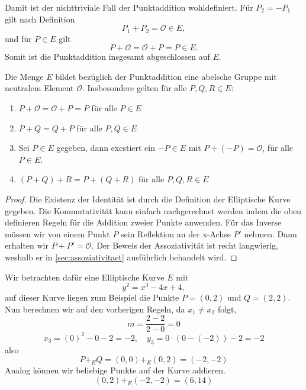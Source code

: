 \begin{bemerkung}
    \label{bem:sum-ist-identitaet}
    Damit ist der nichttriviale Fall der Punktaddition wohldefiniert.
    Für $P_2=-P_1$ gilt nach Definition
    \[
        P_1+P_2=\mathcal{O}\in E,
    \]
    und für $P\in E$ gilt
    \[
        P+\mathcal{O}=\mathcal{O}+P=P\in E.
    \]
    Somit ist die Punktaddition insgesamt abgeschlossen auf $E$.
\end{bemerkung}

\begin{theorem}
    \label{theo:eigenschaften-addition}
    Die Menge $E$ bildet bezüglich der Punktaddition eine abelsche Gruppe
    mit neutralem Element $\mathcal{O}$. Insbesondere gelten für alle
    $P,Q,R\in E$:
    \begin{enumerate}
        \item [Existenz der Identität:] \(P+\mathcal{O}=\mathcal{O}+P=P\) für alle \(P\in E\)
        \item [Kommutativität:] \(P+Q=Q+P\) für alle \(P,Q\in E\)
        \item [Existenz des Inversen:] Sei $P\in E$ gegeben, dann exestiert ein $-P\in E$ mit \(P+(-P)= \mathcal{O}\), für alle $P\in E$.
        \item [Assoziativität:] \((P+Q)+R=P+(Q+R)\) für alle \(P,Q,R\in E\)
    \end{enumerate}
\end{theorem}

\begin{proof}
    Die Existenz der Identität ist durch die Definition der Elliptische Kurve gegeben. Die Kommutativität kann einfach nachgerechnet werden indem die oben definieren Regeln für die Addition zweier Punkte anwenden.
    Für  das Inverse müssen wir von einem Punkt $P$ sein Reflektion an der x-Achse $P'$ nehmen. Dann erhalten wir $P+P'=\mathcal{O}.$
    Der Beweis der Assoziativität ist recht langwierig, weshalb er in \ref{sec:assoziativitaet} ausführlich behandelt wird.
\end{proof}


\begin{beispiel}
    Wir betrachten dafür eine Elliptische Kurve $E$ mit
    \[y^2=x^3-4x+4,\]
    auf dieser Kurve liegen zum Beispiel die Punkte $P=(0,2)$ und $Q=(2,2)$. Nun berechnen wir auf den vorherigen Regeln, da $x_1\neq x_2$ folgt,
    \[
        m = \frac{2-2}{2-0}=0
    \]
    \[
        x_3 = (0)^2-0-2=-2, \quad  y_3 = 0\cdot(0-(-2))-2 =-2
    \]
    also
    \[
        P+_EQ=(0,0)+_E(0,2)= (-2,-2)
    \]
    Analog können wir beliebige Punkte auf der Kurve addieren.
    \[(0,2)+_E(-2,-2)=(6,14)\]
\end{beispiel}

